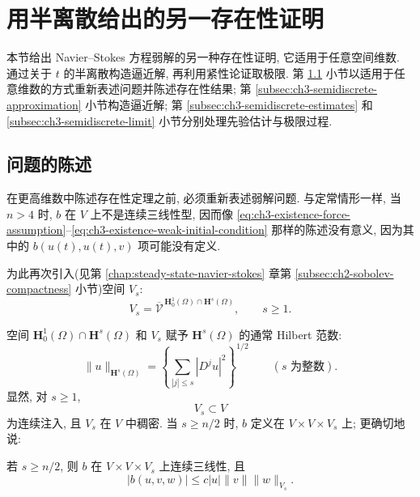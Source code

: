 \hypertarget{chapter-03-section-04-page-231}{}
\section{用半离散给出的另一存在性证明}
\label{sec:ch3-semidiscrete-existence}
本节给出 Navier--Stokes 方程弱解的另一种存在性证明, 它适用于任意空间维数. 通过关于 $t$ 的半离散构造逼近解, 再利用紧性论证取极限. 第 \ref{subsec:ch3-semidiscrete-formulation} 小节以适用于任意维数的方式重新表述问题并陈述存在性结果; 第 \ref{subsec:ch3-semidiscrete-approximation} 小节构造逼近解; 第 \ref{subsec:ch3-semidiscrete-estimates} 和 \ref{subsec:ch3-semidiscrete-limit} 小节分别处理先验估计与极限过程.

\subsection{问题的陈述}
\label{subsec:ch3-semidiscrete-formulation}
在更高维数中陈述存在性定理之前, 必须重新表述弱解问题. 与定常情形一样, 当 $n>4$ 时, $b$ 在 $V$ 上不是连续三线性型, 因而像 \eqref{eq:ch3-existence-force-assumption}--\eqref{eq:ch3-existence-weak-initial-condition} 那样的陈述没有意义, 因为其中的 $b(u(t),u(t),v)$ 项可能没有定义.

为此再次引入(见第 \ref{chap:steady-state-navier-stokes} 章第 \ref{subsec:ch2-sobolev-compactness} 小节)空间 $V_s$:
\begin{equation}
V_s=\overline{\mathcal V}^{\,\mathbf H_0^1(\Omega)\cap\mathbf H^s(\Omega)},
\qquad s\geq1.
\label{eq:ch3-semidiscrete-vs-definition}
\end{equation}

\hypertarget{chapter-03-page-232}{}
空间 $\mathbf H_0^1(\Omega)\cap\mathbf H^s(\Omega)$ 和 $V_s$ 赋予 $\mathbf H^s(\Omega)$ 的通常 Hilbert 范数:
\begin{equation}
\lVert u\rVert_{\mathbf H^s(\Omega)}=
\left\{\sum_{|j|\leq s}|D^ju|^2\right\}^{1/2}
\qquad(s\text{ 为整数}).
\label{eq:ch3-semidiscrete-hs-norm}
\end{equation}
显然, 对 $s\geq1$,
\begin{equation}
V_s\subset V
\label{eq:ch3-semidiscrete-vs-embedding}
\end{equation}
为连续注入, 且 $V_s$ 在 $V$ 中稠密. 当 $s\geq n/2$ 时, $b$ 定义在 $V\times V\times V_s$ 上; 更确切地说:

\begin{Lemma}
\label{lem:ch3-semidiscrete-trilinear-continuity}
若 $s\geq n/2$, 则 $b$ 在 $V\times V\times V_s$ 上连续三线性, 且
\begin{equation}
|b(u,v,w)|\leq c|u|\lVert v\rVert\lVert w\rVert_{V_s}.
\label{eq:ch3-semidiscrete-trilinear-estimate}
\end{equation}
\end{Lemma}

